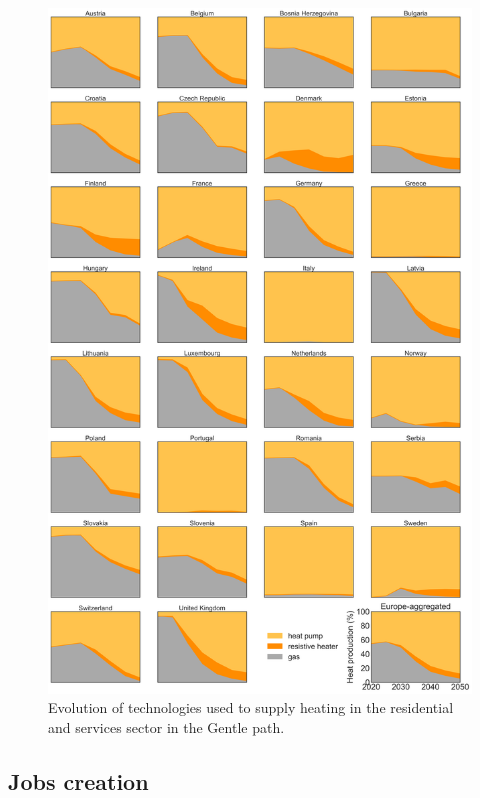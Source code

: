 \documentclass[3p]{elsarticle} %
\begin{document}
\begin{figure}[!h]
\centering
\includegraphics[width=0.8\columnwidth]{figures/heat_production_w_DH_exp_go.png}
\caption{Evolution of technologies used to supply heating in the residential and services sector in the Gentle path. } \label{fig_heating_shares} 
\end{figure}

\FloatBarrier

\subsection{Jobs creation}
\end{document}
